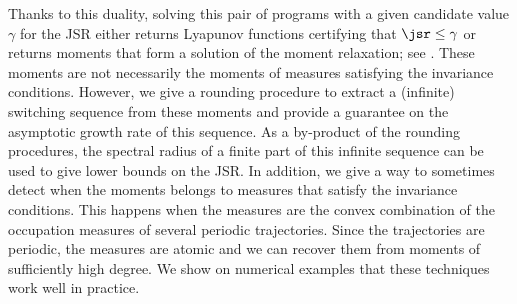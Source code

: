 Thanks to this duality, solving this pair of programs with a given candidate value $\gamma$
for the JSR either returns Lyapunov functions certifying that
$\jsr \leq \gamma$ or returns moments that form a solution of the moment relaxation; see .
These moments are not necessarily the moments of measures satisfying the invariance conditions.
However, we give a rounding procedure to extract a (infinite) switching sequence from these moments
and provide a guarantee on the asymptotic growth rate of this sequence.
As a by-product of the rounding procedures, the spectral radius of a finite part of
this infinite sequence can be used to give lower bounds on the JSR.
In addition, we give a way to sometimes detect when the moments belongs to measures that satisfy the invariance conditions.
This happens when the measures are the convex combination of the occupation measures of several periodic trajectories.
Since the trajectories are periodic, the measures are atomic and we can recover them from moments of sufficiently high degree.
We show on numerical examples that these techniques work well in practice.
